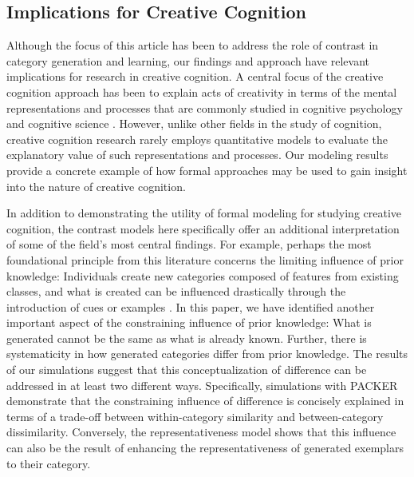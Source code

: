 \documentclass[12pt]{article}
\begin{document}
\begin{flushleft}
\subsection{Implications for Creative Cognition}

Although the focus of this article has been to address the role of contrast in category generation and learning, our findings and approach have relevant implications
for research in creative cognition. A central focus of the creative cognition
approach has been to explain acts of creativity in terms of the mental
representations and processes that are commonly studied in cognitive psychology
and cognitive science \citep{finke1992creative,smith1995creative}. However,
unlike other fields in the study of cognition, creative cognition research
rarely employs quantitative models to evaluate the explanatory value of such
representations and processes. Our modeling results provide a concrete example
of how formal approaches may be used to gain insight into the nature of creative
cognition.

In addition to demonstrating the utility of formal modeling for studying
creative cognition, the contrast models here specifically offer an additional
interpretation of some of the field's most central findings. For example,
perhaps the most foundational principle from this literature concerns the
limiting influence of prior knowledge: Individuals create new categories
composed of features from existing classes, and what is created can be
influenced drastically through the introduction of cues or examples
\citep{marsh1999inadvertent,smith1993constraining}. In this paper, we have
identified another important aspect of the constraining influence of prior
knowledge: What is generated cannot be the same as what is already known.
Further, there is systematicity in how generated categories differ from prior
knowledge. The results of our simulations suggest that this conceptualization of
difference can be addressed in at least two different ways. Specifically,
simulations with PACKER demonstrate that the constraining influence of
difference is concisely explained in terms of a trade-off between
within-category similarity and between-category dissimilarity. Conversely, the
representativeness model shows that this influence can also be the result of
enhancing the representativeness of generated exemplars to their category.


\end{flushleft}
\end{document}
